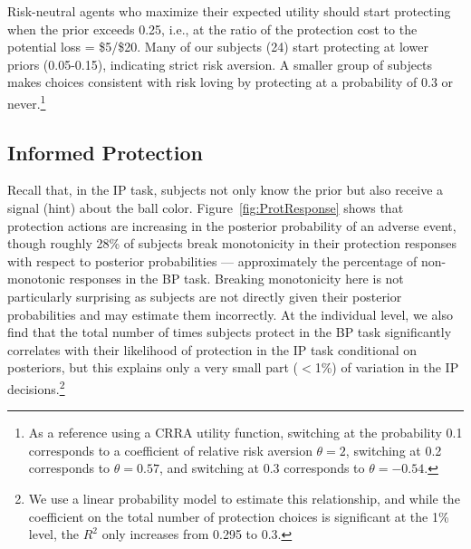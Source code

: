 \documentclass[12pt,a4paper]{article}
\begin{document}

Risk-neutral agents who maximize their expected utility should start protecting when the prior exceeds 0.25, i.e., at the ratio of the protection cost to the potential loss = \$5/\$20. Many of our subjects (24) start protecting at lower priors (0.05-0.15), indicating strict risk aversion.  A smaller group of subjects makes choices consistent with risk loving by protecting at a probability of 0.3 or never.\footnote{As a reference using a CRRA utility function, switching at the probability 0.1 corresponds to a coefficient of relative risk aversion $\theta=2$, switching at 0.2 corresponds to $\theta=0.57$, and switching at 0.3 corresponds to $\theta=-0.54$.} 


\subsection{Informed Protection}

Recall that, in the IP task, subjects not only know the prior but also receive a signal (hint) about the ball color. 
Figure~\ref{fig:ProtResponse} shows that protection actions are increasing in the posterior probability of an adverse event, though roughly 28\% of subjects break monotonicity in their protection responses with respect to posterior probabilities --- approximately the percentage of non-monotonic responses in the BP task.  Breaking monotonicity here is not particularly surprising as subjects are not directly given their posterior probabilities and may estimate them incorrectly. At the individual level, we also find that the total number of times subjects protect in the BP task significantly correlates with their likelihood of protection in the IP task conditional on posteriors, but this explains only a very small part ($<$1\%) of variation in the IP decisions.\footnote{We use a linear probability model to estimate this relationship, and while the coefficient on the total number of protection choices is significant at the 1\% level, the $R^2$ only increases from 0.295 to 0.3.} 
\end{document}
